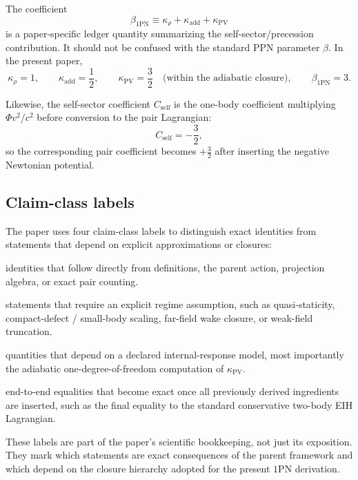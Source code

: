 \documentclass[11pt]{article}
\newcommand{\kadd}{\kappa_{\mathrm{add}}}
\newcommand{\kPV}{\kappa_{\mathrm{PV}}}
\newcommand{\krho}{\kappa_{\rho}}
\newcommand{\betaPN}{\beta_{\mathrm{1PN}}}
\newcommand{\PhiN}{\Phi}
\newcommand{\Cself}{C_{\mathrm{self}}}
\newcommand{\Exact}{\textbf{Exact}}
\newcommand{\Controlled}{\textbf{Controlled reduction}}
\newcommand{\Protocol}{\textbf{Protocol closure}}
\newcommand{\FullMatch}{\textbf{Full assembly}}
\begin{document}
The coefficient
\begin{equation}
\betaPN \equiv \krho+\kadd+\kPV
\label{eq:notation-betaPN}
\end{equation}
is a paper-specific ledger quantity summarizing the self-sector/precession contribution.
It should not be confused with the standard PPN parameter \(\beta\). In the present paper,
\begin{equation}
\krho=1,
\qquad
\kadd=\frac12,
\qquad
\kPV=\frac32
\quad \text{(within the adiabatic closure)},
\qquad
\betaPN=3.
\label{eq:notation-betaPN-values}
\end{equation}

Likewise, the self-sector coefficient \(\Cself\) is the one-body coefficient multiplying
\(\PhiN v^2/c^2\) before conversion to the pair Lagrangian:
\begin{equation}
\Cself=-\frac32,
\label{eq:notation-Cself}
\end{equation}
so the corresponding pair coefficient becomes \(+\frac32\) after inserting the negative
Newtonian potential.

\subsection{Claim-class labels}
\label{app:notation-claimclasses}

The paper uses four claim-class labels to distinguish exact identities from statements
that depend on explicit approximations or closures:
\begin{description}[leftmargin=1.8em,style=nextline]
  \item[\Exact] identities that follow directly from definitions, the parent action,
  projection algebra, or exact pair counting.
  \item[\Controlled] statements that require an explicit regime assumption, such as
  quasi-staticity, compact-defect / small-body scaling, far-field wake closure, or
  weak-field truncation.
  \item[\Protocol] quantities that depend on a declared internal-response model, most
  importantly the adiabatic one-degree-of-freedom computation of \(\kPV\).
  \item[\FullMatch] end-to-end equalities that become exact once all previously derived
  ingredients are inserted, such as the final equality to the standard conservative
  two-body EIH Lagrangian.
\end{description}

These labels are part of the paper's scientific bookkeeping, not just its exposition.
They mark which statements are exact consequences of the parent framework and which depend
on the closure hierarchy adopted for the present \(1\)PN derivation.
\end{document}
